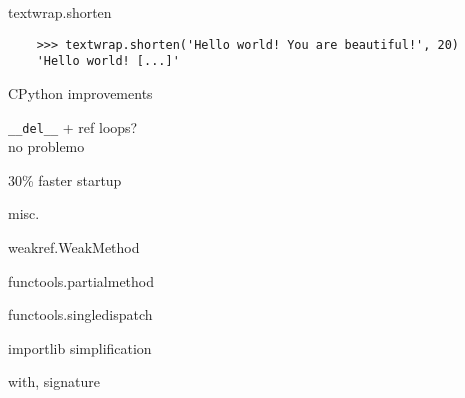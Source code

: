 \documentclass[20pt]{beamer}
\renewcommand\emph[1]{\textcolor{taskyblue}{#1}}
\begin{document}
\begin{center}
\begin{frame}[fragile]
    textwrap.\emph{shorten}
    \bigskip

    \tiny
    \begin{verbatim}
    >>> textwrap.shorten('Hello world! You are beautiful!', 20)
    'Hello world! [...]'
    \end{verbatim}
\end{frame}

\begin{frame}[fragile]
    \emph{CPython} improvements

    \bigskip
    \pause

    \verb+__del__+ + ref loops? \\
    no problemo

    \bigskip
    \pause

     30\% faster startup
\end{frame}

\begin{frame}[fragile]
    misc.

    \bigskip

    weakref.\emph{WeakMethod}

    \bigskip

    functools.\emph{partialmethod}

    \bigskip

    functools.\emph{singledispatch}

    \bigskip

    \emph{importlib} simplification

    \bigskip
    \pause

    with, signature
\end{frame}

\end{center}
\end{document}
